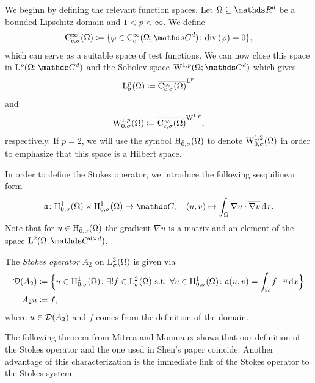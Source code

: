We beginn by defining the relevant function spaces.
Let $\Omega \subseteq \R^d$ be a bounded Lipschitz domain and $1 < p < \infty$. 
We define
\begin{align*}
  \CC_{c, \sigma}^\infty(\Omega) \coloneqq \{ \varphi \in \CC_c^\infty(\Omega; \C^d) \colon \div(\varphi) = 0 \},
\end{align*}
which can serve as a suitable space of test functions.
We can now close this space in $\Ell^p(\Omega; \C^d)$ and the Sobolev space $\WW^{1,p}(\Omega; \C^d)$ which gives
\begin{align*}
  \mathrm{L}_\sigma^p(\Omega) \coloneqq \overline{\mathrm{C}_{c,\sigma}^\infty(\Omega)}^{\mathrm{L}^p}
\end{align*}
and
\begin{align*}
  \mathrm{W}_{0,\sigma}^{1,p}(\Omega) \coloneqq \overline{\mathrm{C}_{c,\sigma}^\infty(\Omega)}^{\mathrm{W}^{1,p}},
\end{align*}
respectively.
If $p = 2$, we will use the symbol $\mathrm{H}_{0,\sigma}^1(\Omega)$ to denote $\mathrm{W}_{0,\sigma}^{1,2}(\Omega)$ in order to emphasize that this space is a Hilbert space.

In order to define the Stokes operator, we introduce the following sesquilinear form
\begin{align*}
  \aform \colon \HH_{0,\sigma}^1(\Omega) \times \HH_{0,\sigma}^1(\Omega) \to \C, \quad (u,v) \mapsto \int_\Omega \nabla u \cdot \overline{\nabla v} \d x.
\end{align*}
Note that for $u \in \mathrm{H}_{0,\sigma}^1(\Omega)$ the gradient $\nabla u$ is a matrix and an element of the space $\Ell^2(\Omega; \C^{d \times d})$.

\begin{defn}
  \label{defn:stokes}
  The \emph{Stokes operator} $A_2$ on $\mathrm{L}_\sigma^2(\Omega)$ is given via
  \begin{align*}
    \mathcal{D}(A_2) &\coloneqq \Big\{ u \in \mathrm{H}_{0,\sigma}^1(\Omega) \colon \exists ! f \in \mathrm{L}^2_\sigma(\Omega) \text{ s.t. } \forall v \in \mathrm{H}_{0,\sigma}^1(\Omega) \colon \mathfrak{a}(u,v) = \int_\Omega f \cdot \overline v \, {\operatorname{d}\!{x}} \Big\} \\
    A_2 u &\coloneqq f,
  \end{align*}
  where $u \in \mathcal{D}(A_2)$ and $f$ comes from the definition of the domain.
\end{defn}

The following theorem from Mitrea and Monniaux \cite[Thm 4.7]{mitreaMonniaux} shows that our definition of the Stokes operator and the one used in Shen's paper \cite{Shen2012} coincide. 
Another advantage of this characterization is the immediate link of the Stokes operator to the Stokes system.


